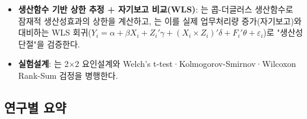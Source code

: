 \documentclass[11pt]{article}
\begin{document}
\begin{itemize}[leftmargin=*]
  \item \textbf{생산함수 기반 상한 추정 + 자기보고 비교(WLS)}: \citet{bok-2025-rapid-ai-diffusion-productivity-effects}는 콥-더글러스 생산함수로 잠재적 생산성효과의 상한을 계산하고, \citet{bok-2026-ai-adoption-productivity-effects}는 이를 실제 업무처리량 증가(자기보고)와 대비하는 WLS 회귀($Y_i=\alpha+\beta X_i+Z_i'\gamma+(X_i\times Z_i)'\delta+F_i'\theta+\varepsilon_i$)로 "생산성 단절"을 검증한다.
  \item \textbf{실험설계}: \citet{min-2025-productivity-gains-generative-ai}는 2$\times$2 요인설계와 Welch's t-test·Kolmogorov-Smirnov·Wilcoxon Rank-Sum 검정을 병행한다.
\end{itemize}

\subsection{연구별 요약}
\end{document}
